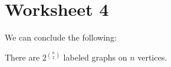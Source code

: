 \documentclass[twoside]{article}
\begin{document}
\section*{Worksheet 4}
\begin{pset}
  We can conclude the following:
  \begin{theorem*}
    There are $2^{\binom{n}{2}}$ labeled graphs on $n$ vertices.
  \end{theorem*}
\end{pset}
\end{document}
